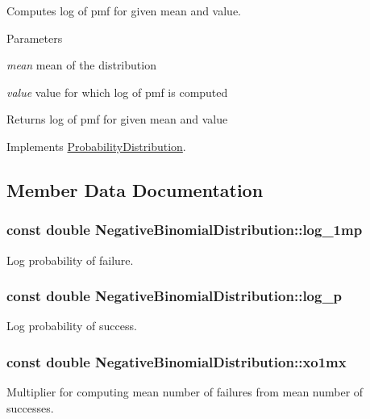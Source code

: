 Computes log of pmf for given mean and value. 
\begin{DoxyParams}{Parameters}
\item[{\em mean}]mean of the distribution \item[{\em value}]value for which log of pmf is computed \end{DoxyParams}
\begin{DoxyReturn}{Returns}
log of pmf for given mean and value 
\end{DoxyReturn}


Implements \hyperlink{classProbabilityDistribution_a9ac2ee460523d2e8f77e7541c9d40ef7}{ProbabilityDistribution}.

\subsection{Member Data Documentation}
\hypertarget{classNegativeBinomialDistribution_a0a58d5dd1b3c0013e29c9c133d5823ca}{
\subsubsection[{log\_\-1mp}]{\setlength{\rightskip}{0pt plus 5cm}const double {\bf NegativeBinomialDistribution::log\_\-1mp}}}
\label{classNegativeBinomialDistribution_a0a58d5dd1b3c0013e29c9c133d5823ca}
Log probability of failure. \hypertarget{classNegativeBinomialDistribution_ad36a45d72380ad6d3ae6bebc01698299}{
\subsubsection[{log\_\-p}]{\setlength{\rightskip}{0pt plus 5cm}const double {\bf NegativeBinomialDistribution::log\_\-p}}}
\label{classNegativeBinomialDistribution_ad36a45d72380ad6d3ae6bebc01698299}
Log probability of success. \hypertarget{classNegativeBinomialDistribution_a822012e6f1c7081e07d3951da182c7e4}{
\subsubsection[{xo1mx}]{\setlength{\rightskip}{0pt plus 5cm}const double {\bf NegativeBinomialDistribution::xo1mx}}}
\label{classNegativeBinomialDistribution_a822012e6f1c7081e07d3951da182c7e4}
Multiplier for computing mean number of failures from mean number of successes. 

